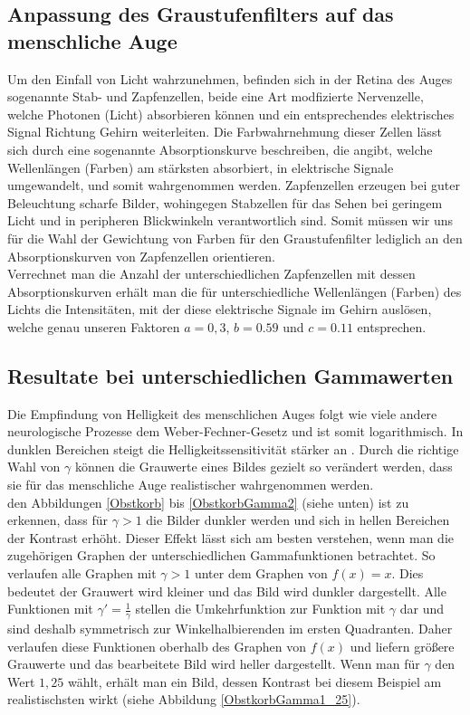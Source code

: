 \documentclass[course=erap]{aspdoc}
\begin{document}
	\subsection{Anpassung des Graustufenfilters auf das menschliche Auge}
	Um den Einfall von Licht wahrzunehmen, befinden sich in der Retina des Auges sogenannte Stab- und Zapfenzellen, beide eine Art modfizierte Nervenzelle, welche Photonen (Licht) absorbieren können und ein entsprechendes elektrisches Signal Richtung Gehirn weiterleiten.
	Die Farbwahrnehmung dieser Zellen lässt sich durch eine sogenannte Absorptionskurve beschreiben, die angibt, welche Wellenlängen (Farben) am stärksten absorbiert, in elektrische Signale umgewandelt, und somit wahrgenommen werden.
	Zapfenzellen erzeugen bei guter Beleuchtung scharfe Bilder, wohingegen Stabzellen für das Sehen bei geringem Licht und in peripheren Blickwinkeln verantwortlich sind. Somit müssen wir uns für die Wahl der Gewichtung von Farben für den Graustufenfilter lediglich an den Absorptionskurven von Zapfenzellen orientieren.\\
	Verrechnet man die Anzahl der unterschiedlichen Zapfenzellen mit dessen Absorptionskurven erhält man die für unterschiedliche Wellenlängen (Farben) des Lichts die Intensitäten, mit der diese elektrische Signale im Gehirn auslösen, welche genau unseren Faktoren $a = 0,3$, $b = 0.59$ und $c = 0.11$ entsprechen.

	\subsection{Resultate bei unterschiedlichen Gammawerten}
	Die Empfindung von Helligkeit des menschlichen Auges folgt wie viele andere neurologische Prozesse dem Weber-Fechner-Gesetz \cite{weberFechnerGesetz} und ist somit logarithmisch. In dunklen Bereichen steigt die Helligkeitssensitivität stärker an \cite{Logarithmische_Helligkeitswahrnehmung}. Durch die richtige Wahl von $\gamma$ können die Grauwerte eines Bildes gezielt so verändert werden, dass sie für das menschliche Auge realistischer wahrgenommen werden. \\

	\noindentAn den Abbildungen \ref{Obstkorb} bis \ref{ObstkorbGamma2} (siehe unten) ist zu erkennen, dass für $\gamma > 1$ die Bilder dunkler werden und sich in hellen Bereichen der Kontrast erhöht. Dieser Effekt lässt sich am besten verstehen, wenn man die zugehörigen Graphen der unterschiedlichen Gammafunktionen betrachtet. So verlaufen alle Graphen mit $\gamma > 1$  unter dem Graphen von $f(x)=x$. Dies bedeutet der Grauwert wird kleiner und das Bild wird dunkler dargestellt. Alle Funktionen mit $\gamma ' = \frac{1}{\gamma}$ stellen die Umkehrfunktion zur Funktion mit $\gamma$ dar und sind deshalb symmetrisch zur Winkelhalbierenden im ersten Quadranten. Daher verlaufen diese Funktionen oberhalb des Graphen von $f(x)$ und liefern größere Grauwerte und das bearbeitete Bild wird heller dargestellt. Wenn man für $\gamma$ den Wert $1,25$ wählt, erhält man ein Bild, dessen Kontrast bei diesem Beispiel am realistischsten wirkt (siehe Abbildung \ref{ObstkorbGamma1_25}).\\
\end{document}
